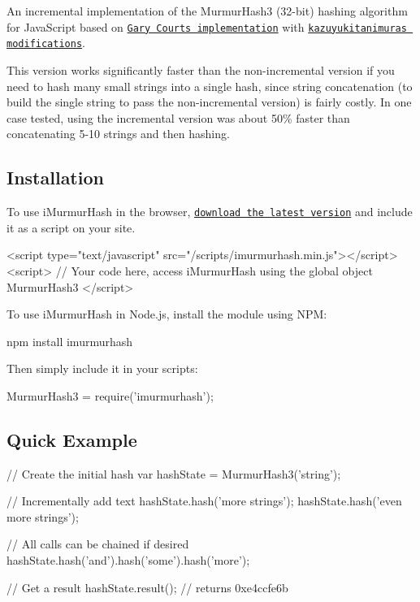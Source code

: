 An incremental implementation of the Murmur\+Hash3 (32-\/bit) hashing algorithm for Java\+Script based on \href{https://github.com/garycourt/murmurhash-js}{\tt Gary Court\textquotesingle{}s implementation} with \href{https://github.com/kazuyukitanimura/murmurhash-js}{\tt kazuyukitanimura\textquotesingle{}s modifications}.

This version works significantly faster than the non-\/incremental version if you need to hash many small strings into a single hash, since string concatenation (to build the single string to pass the non-\/incremental version) is fairly costly. In one case tested, using the incremental version was about 50\% faster than concatenating 5-\/10 strings and then hashing.

\subsection*{Installation }

To use i\+Murmur\+Hash in the browser, \href{https://raw.github.com/jensyt/imurmurhash-js/master/imurmurhash.min.js}{\tt download the latest version} and include it as a script on your site.


\begin{DoxyCode}
<script type="text/javascript" src="/scripts/imurmurhash.min.js"></script>
<script>
// Your code here, access iMurmurHash using the global object MurmurHash3
</script>
\end{DoxyCode}
 



To use i\+Murmur\+Hash in Node.\+js, install the module using N\+PM\+:


\begin{DoxyCode}
npm install imurmurhash
\end{DoxyCode}


Then simply include it in your scripts\+:


\begin{DoxyCode}
MurmurHash3 = require('imurmurhash');
\end{DoxyCode}


\subsection*{Quick Example }


\begin{DoxyCode}
// Create the initial hash
var hashState = MurmurHash3('string');

// Incrementally add text
hashState.hash('more strings');
hashState.hash('even more strings');

// All calls can be chained if desired
hashState.hash('and').hash('some').hash('more');

// Get a result
hashState.result();
// returns 0xe4ccfe6b
\end{DoxyCode}


